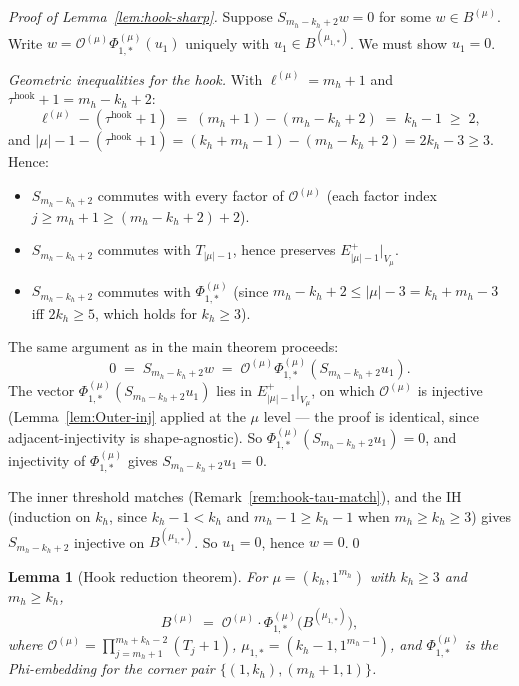 \documentclass[11pt]{article}
\newtheorem{lemma}[theorem]{Lemma}
\theoremstyle{definition}
\newcommand{\Outer}{\mathcal{O}}
\begin{document}
\begin{proof}[Proof of Lemma~\ref{lem:hook-sharp}]
Suppose $S_{m_h-k_h+2} w = 0$ for some $w \in B^{(\mu)}$. Write
$w = \Outer^{(\mu)} \Phi^{(\mu)}_{1,*}(u_1)$ uniquely with $u_1 \in
B^{(\mu_{1,*})}$. We must show $u_1 = 0$.

\emph{Geometric inequalities for the hook.} With
$\ell^{(\mu)} = m_h + 1$ and $\tau^{\mathrm{hook}} + 1 = m_h - k_h + 2$:
\[
   \ell^{(\mu)} - (\tau^{\mathrm{hook}} + 1)
   \;=\; (m_h + 1) - (m_h - k_h + 2) \;=\; k_h - 1 \;\ge\; 2,
\]
and $|\mu| - 1 - (\tau^{\mathrm{hook}} + 1) = (k_h + m_h - 1) -
(m_h - k_h + 2) = 2k_h - 3 \ge 3$. Hence:
\begin{itemize}[topsep=0.2em,itemsep=0.1em]
\item $S_{m_h-k_h+2}$ commutes with every factor of $\Outer^{(\mu)}$
   (each factor index $j \ge m_h + 1 \ge (m_h - k_h + 2) + 2$).
\item $S_{m_h-k_h+2}$ commutes with $T_{|\mu|-1}$, hence preserves
   $E^+_{|\mu|-1}|_{V_\mu}$.
\item $S_{m_h-k_h+2}$ commutes with $\Phi^{(\mu)}_{1,*}$ (since
   $m_h - k_h + 2 \le |\mu| - 3 = k_h + m_h - 3$ iff $2k_h \ge 5$,
   which holds for $k_h \ge 3$).
\end{itemize}

The same argument as in the main theorem proceeds:
\[
   0 \;=\; S_{m_h-k_h+2} w
   \;=\; \Outer^{(\mu)} \Phi^{(\mu)}_{1,*}(S_{m_h-k_h+2} u_1).
\]
The vector $\Phi^{(\mu)}_{1,*}(S_{m_h-k_h+2} u_1)$ lies in
$E^+_{|\mu|-1}|_{V_\mu}$, on which $\Outer^{(\mu)}$ is injective
(Lemma~\ref{lem:Outer-inj} applied at the $\mu$ level — the proof is
identical, since adjacent-injectivity is shape-agnostic). So
$\Phi^{(\mu)}_{1,*}(S_{m_h-k_h+2} u_1) = 0$, and injectivity of
$\Phi^{(\mu)}_{1,*}$ gives $S_{m_h-k_h+2} u_1 = 0$.

The inner threshold matches (Remark~\ref{rem:hook-tau-match}), and the
IH (induction on $k_h$, since $k_h - 1 < k_h$ and $m_h - 1 \ge k_h - 1$
when $m_h \ge k_h \ge 3$) gives $S_{m_h-k_h+2}$ injective on
$B^{(\mu_{1,*})}$. So $u_1 = 0$, hence $w = 0$.\qed
\end{proof}

\begin{lemma}[Hook reduction theorem]\label{lem:hook-reduction}
For $\mu = (k_h, 1^{m_h})$ with $k_h \ge 3$ and $m_h \ge k_h$,
\[
   B^{(\mu)} \;=\; \Outer^{(\mu)} \cdot
   \Phi^{(\mu)}_{1,*}\bigl(B^{(\mu_{1,*})}\bigr),
\]
where $\Outer^{(\mu)} = \prod_{j=m_h+1}^{m_h+k_h-2}(T_j+1)$,
$\mu_{1,*} = (k_h-1, 1^{m_h-1})$, and $\Phi^{(\mu)}_{1,*}$ is the
Phi-embedding for the corner pair $\{(1, k_h), (m_h+1, 1)\}$.
\end{lemma}
\end{document}

